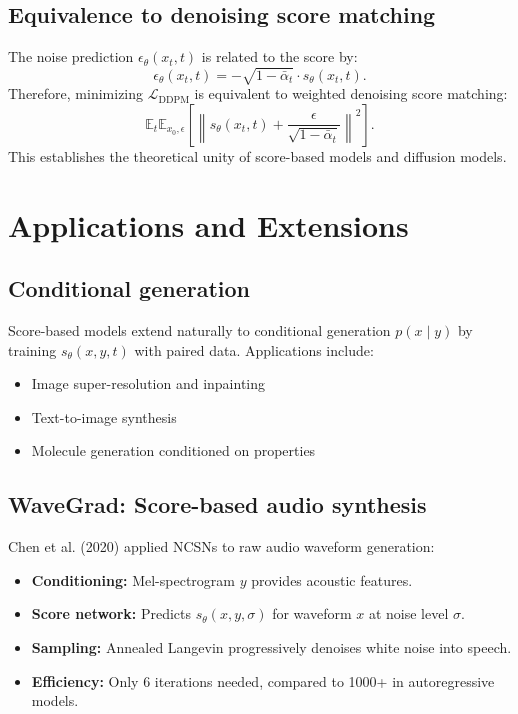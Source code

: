 \documentclass[11pt]{article}
\theoremstyle{definition}
\begin{document}
\subsection{Equivalence to denoising score matching}
The noise prediction $\epsilon_\theta(x_t, t)$ is related to the score by:
\begin{equation}
\epsilon_\theta(x_t, t) = -\sqrt{1-\bar{\alpha}_t} \cdot s_\theta(x_t, t).
\end{equation}
Therefore, minimizing $\mathcal{L}_{\text{DDPM}}$ is equivalent to weighted denoising score matching:
\begin{equation}
\mathbb{E}_t \mathbb{E}_{x_0, \epsilon}\left[\left\| s_\theta(x_t, t) + \frac{\epsilon}{\sqrt{1-\bar{\alpha}_t}} \right\|^2\right].
\end{equation}
This establishes the theoretical unity of score-based models and diffusion models.

\section{Applications and Extensions}

\subsection{Conditional generation}
Score-based models extend naturally to conditional generation $p(x \mid y)$ by training 
$s_\theta(x, y, t)$ with paired data. Applications include:
\begin{itemize}
\item Image super-resolution and inpainting
\item Text-to-image synthesis
\item Molecule generation conditioned on properties
\end{itemize}

\subsection{WaveGrad: Score-based audio synthesis}
Chen et al. (2020) applied NCSNs to raw audio waveform generation:
\begin{itemize}
\item \textbf{Conditioning:} Mel-spectrogram $y$ provides acoustic features.
\item \textbf{Score network:} Predicts $s_\theta(x, y, \sigma)$ for waveform $x$ at noise level $\sigma$.
\item \textbf{Sampling:} Annealed Langevin progressively denoises white noise into speech.
\item \textbf{Efficiency:} Only 6 iterations needed, compared to 1000+ in autoregressive models.
\end{itemize}
\end{document}
